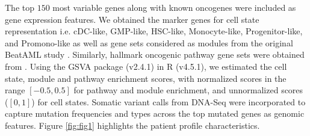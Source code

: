 \documentclass[sigconf,authordraft]{acmart}
\begin{document}
The top $150$ most variable genes along with known oncogenes \cite{jani2024pt} were included as gene expression features. 
We obtained the marker genes for cell state representation i.e. cDC-like, GMP-like, HSC-like, Monocyte-like, Progenitor-like, and Promono-like as well as gene sets considered as modules from the original BeatAML study \cite{bottomly2022integrative}. 
Similarly, hallmark oncogenic pathway gene sets were obtained from \cite{roelands2020oncogenic}. 
Using the GSVA package (v2.4.1) \cite{hanzelmann2013gsva} in R (v4.5.1), we estimated the cell state, module and pathway enrichment scores, with normalized scores in the range $[-0.5, 0.5]$ for pathway and module enrichment, and unnormalized scores ($[0,1]$) for cell states. 
Somatic variant calls from DNA-Seq were incorporated to capture mutation frequencies and types across the top mutated genes as genomic features. Figure \ref{fig:fig1} highlights the patient profile characteristics.
\vspace{-2.5mm}
\end{document}
